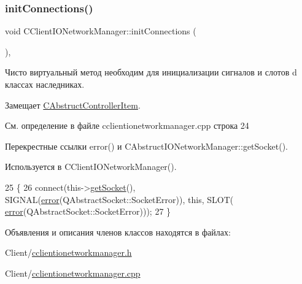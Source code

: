\subsubsection{\texorpdfstring{init\+Connections()}{initConnections()}}
{\footnotesize\ttfamily void C\+Client\+I\+O\+Network\+Manager\+::init\+Connections (\begin{DoxyParamCaption}{ }\end{DoxyParamCaption})\hspace{0.3cm}{\ttfamily [protected]}, {\ttfamily [virtual]}}



Чисто виртуальный метод необходим для инициализации сигналов и слотов d классах наследниках. 



Замещает \hyperlink{class_c_abstruct_controller_item_a27c6889230a86cb0782e6d7596b883c1}{C\+Abstruct\+Controller\+Item}.



См. определение в файле cclientionetworkmanager.\+cpp строка 24



Перекрестные ссылки error() и C\+Abstruct\+I\+O\+Network\+Manager\+::get\+Socket().



Используется в C\+Client\+I\+O\+Network\+Manager().


\begin{DoxyCode}
25 \{
26     connect(this->\hyperlink{class_c_abstruct_i_o_network_manager_a118a2c8254c149614cba51c42147c709}{getSocket}(), SIGNAL(\hyperlink{class_c_client_i_o_network_manager_a1a4c3fd9405b85cb43e20b24d9db18e8}{error}(QAbstractSocket::SocketError)), \textcolor{keyword}{this}, SLOT(
      \hyperlink{class_c_client_i_o_network_manager_a1a4c3fd9405b85cb43e20b24d9db18e8}{error}(QAbstractSocket::SocketError)));
27 \}
\end{DoxyCode}


Объявления и описания членов классов находятся в файлах\+:\begin{DoxyCompactItemize}
\item 
Client/\hyperlink{cclientionetworkmanager_8h}{cclientionetworkmanager.\+h}\item 
Client/\hyperlink{cclientionetworkmanager_8cpp}{cclientionetworkmanager.\+cpp}\end{DoxyCompactItemize}
